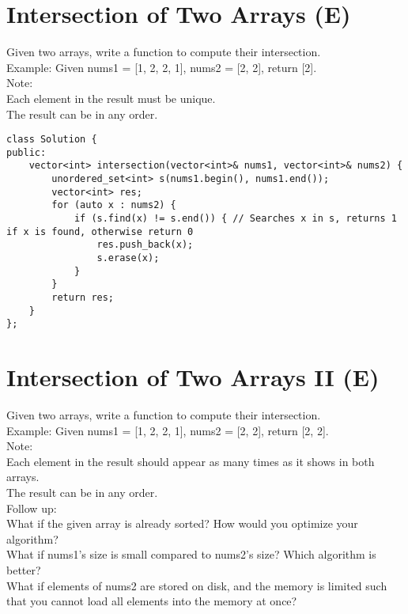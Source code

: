 \section{Intersection of Two Arrays (E)}
Given two arrays, write a function to compute their intersection.\\

Example:
Given nums1 = [1, 2, 2, 1], nums2 = [2, 2], return [2].\\

Note: \\
    Each element in the result must be unique.\\
    The result can be in any order.\\
    
\begin{lstlisting}
class Solution {
public:
    vector<int> intersection(vector<int>& nums1, vector<int>& nums2) {
        unordered_set<int> s(nums1.begin(), nums1.end());
        vector<int> res;
        for (auto x : nums2) {
            if (s.find(x) != s.end()) { // Searches x in s, returns 1 if x is found, otherwise return 0
                res.push_back(x);
                s.erase(x);
            }
        }
        return res;
    }
};
\end{lstlisting}   


\section{Intersection of Two Arrays II (E)}
Given two arrays, write a function to compute their intersection.\\

Example:
Given nums1 = [1, 2, 2, 1], nums2 = [2, 2], return [2, 2].\\

Note:\\
    Each element in the result should appear as many times as it shows in both arrays.\\
    The result can be in any order.\\

Follow up:\\
    What if the given array is already sorted? How would you optimize your algorithm?\\
    What if nums1's size is small compared to nums2's size? Which algorithm is better?\\
    What if elements of nums2 are stored on disk, and the memory is limited such that you cannot load all elements into the memory at once?\\


